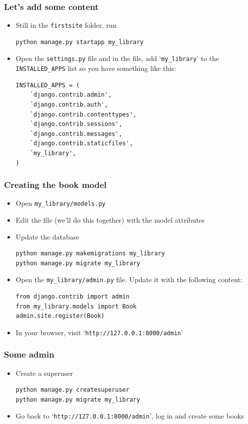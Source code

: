 \documentclass[10pt,t,xcolor=dvipsnames]{beamer}
\begin{document}
\begin{frame}[fragile]
\frametitle{Let's add some content}
\begin{itemize}[<+->]
\item Still in the \texttt{firstsite} folder, run
\begin{lstlisting}
python manage.py startapp my_library
\end{lstlisting}
\item Open the \texttt{settings.py} file and in the file, add `\texttt{my\_library}' to the \texttt{INSTALLED\_APPS} list so you have something like this:
\begin{verbatim}
INSTALLED_APPS = (
    `django.contrib.admin',
    `django.contrib.auth',
    `django.contrib.contenttypes',
    `django.contrib.sessions',
    `django.contrib.messages',
    `django.contrib.staticfiles',
    `my_library',
)
\end{verbatim}
\end{itemize}
\end{frame}
\begin{frame}[fragile]
\frametitle{Creating the book model}
\begin{itemize}[<+->]
\item Open \texttt{my\_library/models.py}
\item Edit the file (we'll do this together) with the model attributes
\item Update the database
\begin{lstlisting}
python manage.py makemigrations my_library
python manage.py migrate my_library
\end{lstlisting}
\item Open the \texttt{my\_library/admin.py} file. Update it with the following content:
\begin{verbatim}
from django.contrib import admin
from my_library.models import Book
admin.site.register(Book)
\end{verbatim}
\item In your browser, visit `\texttt{http://127.0.0.1:8000/admin}'
\end{itemize}
\end{frame}
\begin{frame}[fragile]
\frametitle{Some admin}
\begin{itemize}[<+->]
\item Create a superuser
\begin{lstlisting}
python manage.py createsuperuser
python manage.py migrate my_library
\end{lstlisting}
\item Go back to `\texttt{http://127.0.0.1:8000/admin}', log in and create some books
\end{itemize}
\end{frame}
\end{document}
